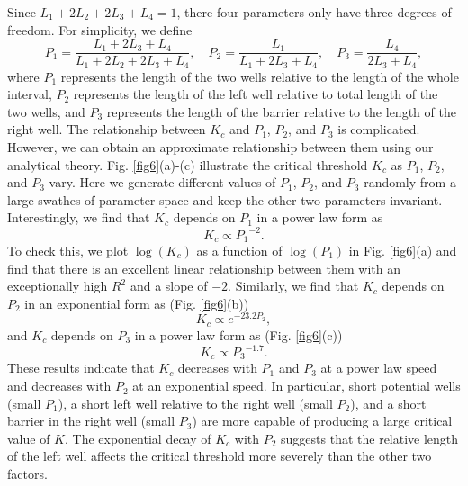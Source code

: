 \documentclass[a4paper,11pt]{article}
\begin{document}
Since $L_1 + 2 L_2 + 2 L_3 + L_4 = 1$, there four parameters only have three degrees of freedom. For simplicity, we define
\begin{equation}
P_1 = \frac{L_1 + 2 L_3 + L_4}{L_1 + 2 L_2 + 2 L_3 + L_4}, \quad P_2 = \frac{L_1}{L_1 + 2 L_3 + L_4}, \quad P_3 = \frac{L_4}{2 L_3 + L_4},
\end{equation}
where $P_1$ represents the length of the two wells relative to the length of the whole interval, $P_2$ represents the length of the left well relative to total length of the two wells, and $P_3$ represents the length of the barrier relative to the length of the right well. The relationship between $K_c$ and $P_1$, $P_2$, and $P_3$ is complicated. However, we can obtain an approximate relationship between them using our analytical theory. Fig. \ref{fig6}(a)-(c) illustrate the critical threshold $K_c$ as $P_1$, $P_2$, and $P_3$ vary. Here we generate different values of $P_1$, $P_2$, and $P_3$ randomly from a large swathes of parameter space and keep the other two parameters invariant. Interestingly, we find that $K_c$ depends on $P_1$ in a power law form as
\begin{equation}
K_c \propto {P_1}^{-2}.
\end{equation}
To check this, we plot $\log(K_c)$ as a function of $\log(P_1)$ in Fig. \ref{fig6}(a) and find that there is an excellent linear relationship between them with an exceptionally high $R^2$ and a slope of $-2$. Similarly, we find that $K_c$ depends on $P_2$ in an exponential form as (Fig. \ref{fig6}(b))
\begin{equation}
K_c \propto e^{-23.2P_2},
\end{equation}
and $K_c$ depends on $P_3$ in a power law form as (Fig. \ref{fig6}(c))
\begin{equation}
K_c \propto {P_3}^{-1.7}.
\end{equation}
These results indicate that $K_c$ decreases with $P_1$ and $P_3$ at a power law speed and decreases with $P_2$ at an exponential speed. In particular, short potential wells (small $P_1$), a short left well relative to the right well (small $P_2$), and a short barrier in the right well (small $P_3$) are more capable of producing a large critical value of $K$. The exponential decay of $K_c$ with $P_2$ suggests that the relative length of the left well affects the critical threshold more severely than the other two factors.
\end{document}
